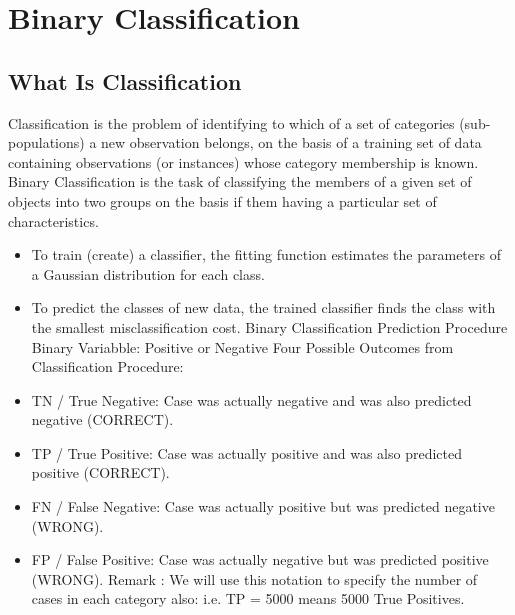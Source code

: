\documentclass[a4paper,12pt]{article}
\begin{document}
\section{Binary Classification}
\subsection{What Is Classification}
Classification is the problem of identifying to which of a set of categories (sub-populations) a new
observation belongs, on the basis of a training set of data containing observations (or instances)
whose category membership is known. Binary Classification is the task of classifying the members of
a given set of objects into two groups on the basis if them having a particular set of characteristics.
\begin{itemize}

\item  To train (create) a classifier, the fitting function estimates the parameters of a Gaussian
distribution for each class.
\item  To predict the classes of new data, the trained classifier finds the class with the smallest
misclassification cost.
Binary Classification Prediction Procedure
Binary Variabble: Positive or Negative
Four Possible Outcomes from Classification Procedure:
\item  TN / True Negative: Case was actually negative and was also predicted negative
(CORRECT).
\item  TP / True Positive: Case was actually positive and was also predicted positive (CORRECT).
\item  FN / False Negative: Case was actually positive but was predicted negative
(WRONG).
\item  FP / False Positive: Case was actually negative but was predicted positive (WRONG).
Remark : We will use this notation to specify the number of cases in each category also: i.e. TP
= 5000 means 5000 True Positives.


\end{itemize}
\end{document}
